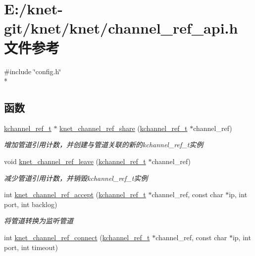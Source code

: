 \hypertarget{a00052}{}\section{E\+:/knet-\/git/knet/knet/channel\+\_\+ref\+\_\+api.h 文件参考}
\label{a00052}
{\ttfamily \#include \char`\"{}config.\+h\char`\"{}}\\*
\subsection*{函数}
\begin{DoxyCompactItemize}
\item 
\hyperlink{a00053_a3b7e82599367eade261456f60ebe2cd9_a3b7e82599367eade261456f60ebe2cd9}{kchannel\+\_\+ref\+\_\+t} $\ast$ \hyperlink{a00105_ga45710b87649c232603ae708616eddd85_ga45710b87649c232603ae708616eddd85}{knet\+\_\+channel\+\_\+ref\+\_\+share} (\hyperlink{a00053_a3b7e82599367eade261456f60ebe2cd9_a3b7e82599367eade261456f60ebe2cd9}{kchannel\+\_\+ref\+\_\+t} $\ast$channel\+\_\+ref)
\begin{DoxyCompactList}\small\item\em 增加管道引用计数，并创建与管道关联的新的kchannel\+\_\+ref\+\_\+t实例 \end{DoxyCompactList}\item 
void \hyperlink{a00105_ga6eded28dc89d84e8ed33615bbd205bae_ga6eded28dc89d84e8ed33615bbd205bae}{knet\+\_\+channel\+\_\+ref\+\_\+leave} (\hyperlink{a00053_a3b7e82599367eade261456f60ebe2cd9_a3b7e82599367eade261456f60ebe2cd9}{kchannel\+\_\+ref\+\_\+t} $\ast$channel\+\_\+ref)
\begin{DoxyCompactList}\small\item\em 减少管道引用计数，并销毁kchannel\+\_\+ref\+\_\+t实例 \end{DoxyCompactList}\item 
int \hyperlink{a00105_ga92a683023f347ae7c4eb692180884a01_ga92a683023f347ae7c4eb692180884a01}{knet\+\_\+channel\+\_\+ref\+\_\+accept} (\hyperlink{a00053_a3b7e82599367eade261456f60ebe2cd9_a3b7e82599367eade261456f60ebe2cd9}{kchannel\+\_\+ref\+\_\+t} $\ast$channel\+\_\+ref, const char $\ast$ip, int port, int backlog)
\begin{DoxyCompactList}\small\item\em 将管道转换为监听管道 \end{DoxyCompactList}\item 
int \hyperlink{a00105_gad8fc0ffe3928e6914b3ec50810e2e79f_gad8fc0ffe3928e6914b3ec50810e2e79f}{knet\+\_\+channel\+\_\+ref\+\_\+connect} (\hyperlink{a00053_a3b7e82599367eade261456f60ebe2cd9_a3b7e82599367eade261456f60ebe2cd9}{kchannel\+\_\+ref\+\_\+t} $\ast$channel\+\_\+ref, const char $\ast$ip, int port, int timeout)

\end{DoxyCompactItemize}
